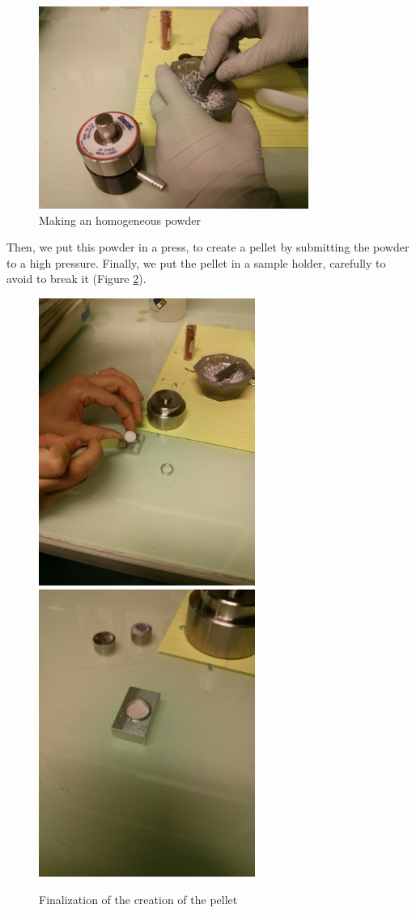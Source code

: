 \documentclass[11pt,a4paper,oneside]{report}
\begin{document}
\begin{figure}[H]
    \centering
    \includegraphics[width=250pt]{Images/pellet1.jpg}
    \caption{Making an homogeneous powder}
    \label{MixMortier}
\end{figure}


Then, we put this powder in a press, to create a pellet by submitting the powder to a high pressure. Finally, we put the pellet in a sample holder, carefully to avoid to break it (Figure \ref{pellet}).

\begin{figure}[H]
\centering
\includegraphics[width=200pt]{Images/pellet2.jpg}
\includegraphics[width=200pt]{Images/pellet3.jpg}
\caption{Finalization of the creation of the pellet}
\label{pellet}    
\end{figure} 
\end{document}
